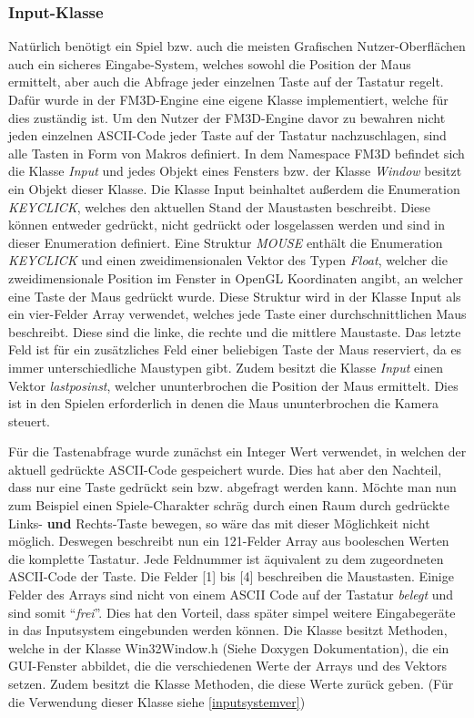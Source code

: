 \subsubsection{Input-Klasse}

Natürlich benötigt ein Spiel bzw. auch die meisten Grafischen Nutzer-Oberflächen auch ein sicheres Eingabe-System, welches sowohl die Position der Maus ermittelt, aber auch die Abfrage jeder einzelnen Taste auf der Tastatur regelt. 
Dafür wurde in der FM3D-Engine eine eigene Klasse implementiert, welche für dies zuständig ist.
Um den Nutzer der FM3D-Engine davor zu bewahren nicht jeden einzelnen ASCII-Code jeder Taste auf der Tastatur nachzuschlagen, sind alle Tasten in Form von Makros definiert. 
In dem Namespace FM3D befindet sich die Klasse \textit{Input} und jedes Objekt eines Fensters bzw. der Klasse \textit{Window} besitzt ein Objekt dieser Klasse. Die Klasse Input beinhaltet außerdem die Enumeration \textit{KEYCLICK}, welches den aktuellen Stand der Maustasten beschreibt. Diese können entweder gedrückt, nicht gedrückt oder losgelassen werden und sind in dieser Enumeration definiert.
Eine Struktur \textit{MOUSE} enthält die Enumeration \textit{KEYCLICK} und einen zweidimensionalen Vektor des Typen \textit{Float}, welcher die zweidimensionale Position im Fenster in OpenGL Koordinaten angibt, an welcher eine Taste der Maus gedrückt wurde.
Diese Struktur wird in der Klasse Input als ein vier-Felder Array verwendet, welches jede Taste einer durchschnittlichen Maus beschreibt. Diese sind die linke, die rechte und die mittlere Maustaste. Das letzte Feld ist für ein zusätzliches Feld einer beliebigen Taste der Maus reserviert, da es immer unterschiedliche Maustypen gibt.
Zudem besitzt die Klasse \textit{Input} einen Vektor \textit{lastposinst}, welcher ununterbrochen die Position der Maus ermittelt. Dies ist in den Spielen erforderlich in denen die Maus ununterbrochen die Kamera steuert.

Für die Tastenabfrage wurde zunächst ein Integer Wert verwendet, in welchen der aktuell gedrückte ASCII-Code gespeichert wurde. Dies hat aber den Nachteil, dass nur eine Taste gedrückt sein bzw. abgefragt werden kann. Möchte man nun zum Beispiel einen Spiele-Charakter schräg durch einen Raum durch gedrückte Links- \textbf{und} Rechts-Taste bewegen, so wäre das mit dieser Möglichkeit nicht möglich. Deswegen beschreibt nun ein 121-Felder Array aus booleschen Werten die komplette Tastatur. Jede Feldnummer ist äquivalent zu dem zugeordneten ASCII-Code der Taste. Die Felder [1] bis [4] beschreiben die Maustasten. Einige Felder des Arrays sind nicht von einem ASCII Code auf der Tastatur \textit{belegt} und sind somit "`\textit{frei}"'. Dies hat den Vorteil, dass später simpel weitere Eingabegeräte in das Inputsystem eingebunden werden können.
Die Klasse besitzt Methoden, welche in der Klasse Win32Window.h (Siehe Doxygen Dokumentation), die ein GUI-Fenster abbildet, die die verschiedenen Werte der Arrays und des Vektors setzen.
Zudem besitzt die Klasse Methoden, die diese Werte zurück geben. (Für die Verwendung dieser Klasse siehe \cref{inputsystemver})